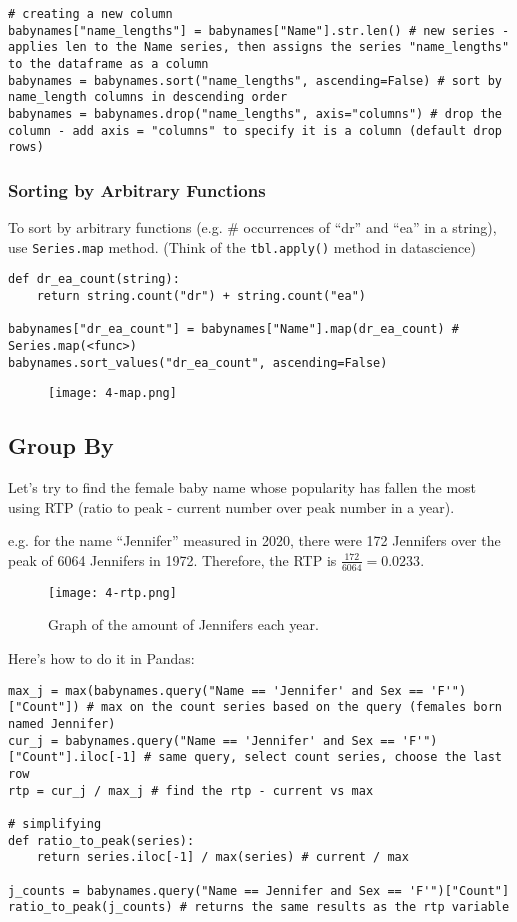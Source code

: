 \begin{verbatim}
# creating a new column 
babynames["name_lengths"] = babynames["Name"].str.len() # new series - applies len to the Name series, then assigns the series "name_lengths" to the dataframe as a column
babynames = babynames.sort("name_lengths", ascending=False) # sort by name_length columns in descending order
babynames = babynames.drop("name_lengths", axis="columns") # drop the column - add axis = "columns" to specify it is a column (default drop rows)
\end{verbatim}

\subsubsection{Sorting by Arbitrary Functions}
To sort by arbitrary functions (e.g. \# occurrences of ``dr'' and ``ea'' in a string), use \texttt{Series.map} method. (Think of the \texttt{tbl.apply()} method in datascience)

\begin{verbatim}
def dr_ea_count(string):
    return string.count("dr") + string.count("ea")

babynames["dr_ea_count"] = babynames["Name"].map(dr_ea_count) # Series.map(<func>)
babynames.sort_values("dr_ea_count", ascending=False)
\end{verbatim}
\begin{figure}[ht]
\texttt{[image: 4-map.png]}\centering
\end{figure}

\subsection{Group By}
Let's try to find the female baby name whose popularity has fallen the most using RTP (ratio to peak - current number over peak number in a year).

e.g. for the name ``Jennifer'' measured in 2020, there were 172 Jennifers over the peak of 6064 Jennifers in 1972. Therefore, the RTP is $\frac{172}{6064} = 0.0233$.
\begin{figure}[ht]
\texttt{[image: 4-rtp.png]}\centering\caption{Graph of the amount of Jennifers each year.}
\end{figure}

Here's how to do it in Pandas:
\begin{verbatim}
max_j = max(babynames.query("Name == 'Jennifer' and Sex == 'F'")["Count"]) # max on the count series based on the query (females born named Jennifer)
cur_j = babynames.query("Name == 'Jennifer' and Sex == 'F'")["Count"].iloc[-1] # same query, select count series, choose the last row
rtp = cur_j / max_j # find the rtp - current vs max

# simplifying
def ratio_to_peak(series):
    return series.iloc[-1] / max(series) # current / max 

j_counts = babynames.query("Name == Jennifer and Sex == 'F'")["Count"]
ratio_to_peak(j_counts) # returns the same results as the rtp variable 
\end{verbatim}

